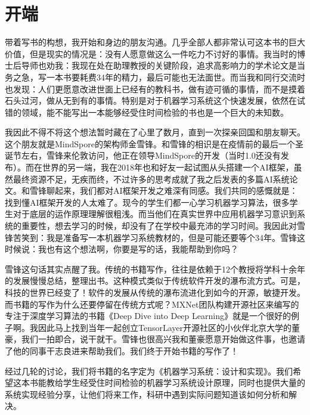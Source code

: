 \documentclass[letterpaper,10pt,english]{sphinxmanual}
\begin{document}
\section{开端}
\label{\detokenize{chapter_preface/index:id3}}
\sphinxAtStartPar
带着写书的构想，我开始和身边的朋友沟通。几乎全部人都非常认可这本书的巨大价值，但是现实的情况是：没有人愿意做这么一件吃力不讨好的事情。我当时的博士后导师也劝我：我现在处在助理教授的关键阶段，追求高影响力的学术论文是当务之急，写一本书要耗费3\sphinxhyphen{}4年的精力，最后可能也无法面世。而当我和同行交流时也发现：人们更愿意改进世面上已经有的教科书，做有迹可循的事情，而不是摸着石头过河，做从无到有的事情。特别是对于机器学习系统这个快速发展，依然在试错的领域，能不能写出一本能够经受住时间检验的书也是一个巨大的未知数。

\sphinxAtStartPar
我因此不得不将这个想法暂时藏在了心里了数月，直到一次探亲回国和朋友聊天。这个朋友就是MindSpore的架构师金雪锋。和雪锋的相识是在疫情前的最后一个圣诞节左右，雪锋来伦敦访问，他正在领导MindSpore的开发（当时1.0还没有发布）。而在世界的另一端，我在2018年也和好友一起试图从头搭建一个AI框架，虽然最终资源不足，无疾而终，不过许多的思考成就了我之后发表的多篇AI系统论文。和雪锋聊起来，我们都对AI框架开发之难深有同感。我们共同的感慨就是：找到懂AI框架开发的人太难了。现今的学生们都一心学习机器学习算法，很多学生对于底层的运作原理理解很粗浅。而当他们在真实世界中应用机器学习意识到系统的重要性，想去学习的时候，却没有了在学校中最充沛的学习时间。我因此对雪锋苦笑到：我是准备写一本机器学习系统教材的，但是可能还要等个3\sphinxhyphen{}4年。雪锋这时候说：我也有这个想法啊，你要是写的话，我能帮助到你吗？

\sphinxAtStartPar
雪锋这句话其实点醒了我。传统的书籍写作，往往是依赖于1\sphinxhyphen{}2个教授将学科十余年的发展慢慢总结，整理出书。这种模式类似于传统软件开发的瀑布流方式。可是，科技的世界已经变了！软件的发展从传统的瀑布流进化到如今的开源，敏捷开发。而书籍的写作为什么还要停留在传统方式呢？MXNet团队构建开源社区来编写的专注于深度学习算法的书籍《Deep
Dive into Deep
Learning》就是一个很好的例子啊。我因此马上找到当年一起创立TensorLayer开源社区的小伙伴北京大学的董豪，我们一拍即合，说干就干。雪锋也很高兴我和董豪愿意开始做这件事，也邀请了他的同事干志良进来帮助我们。我们终于开始书籍的写作了！

\sphinxAtStartPar
经过几轮的讨论，我们将书籍的名字定为《机器学习系统：设计和实现》。我们希望这本书能教给学生经受住时间检验的机器学习系统设计原理，同时也提供大量的系统实现经验分享，让他们将来工作，科研中遇到实际问题知道该如何分析和解决。
\end{document}
